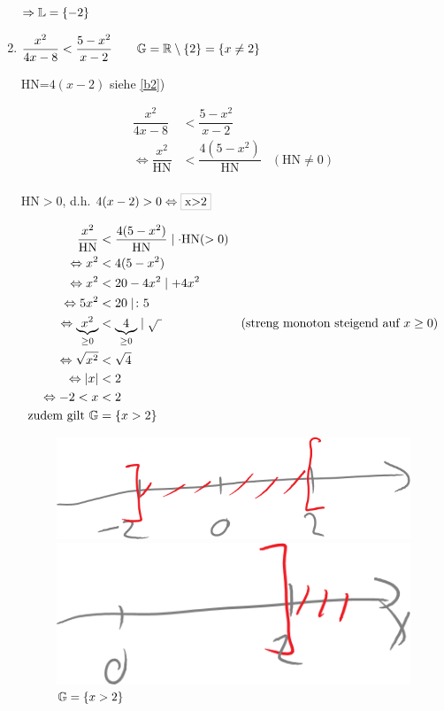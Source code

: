 \begin{enumerate}
	$\Rightarrow \mathbb{L}=\{-2\}$
	
	\clearpage
	\item $\dfrac{x^2}{4x-8} < \dfrac{5-x^2}{x-2}\qquad\mathbb{G}=\mathbb{R}\setminus\{2\}=\{x\ne2\}$
	
	HN=$4(x-2)$ siehe \ref{b2})
	
	\begin{align*}
	\dfrac{x^2}{4x-8} &< \dfrac{5-x^2}{x-2}\\
	\Leftrightarrow\dfrac{x^2}{\text{HN}} &< \dfrac{4(5-x^2)}{\text{HN}}&(\text{HN}\ne0)\\
	\end{align*}
	
	 HN$>0$, d.h. $4(x-2)>0\Leftrightarrow\grayframe{x>2}$
	
	\begin{align*}
	\dfrac{x^2}{\text{HN}} &< \dfrac{4(5-x^2)}{\text{HN}}\mid\cdot\text{HN}(>0)\\
	\Leftrightarrow x^2 &<4(5-x^2)\\
	\Leftrightarrow x^2 &<20-4x^2\mid+4x^2\\
	\Leftrightarrow 5x^2 &<20\mid\colon5\\
	\Leftrightarrow \underbrace{x^2}_{\ge0} &<\underbrace{4}_{\ge0}\mid\sqrt{\ }&\text{(streng monoton steigend auf }x\ge0)\\
	\Leftrightarrow \sqrt{x^2} &< \sqrt{4}\\
	\Leftrightarrow |x| &< 2\\
	\Leftrightarrow -2 < x &< 2\\
	\text{zudem gilt }\mathbb{G} &= \{x>2\}\\
	\end{align*}
	
	\begin{figure}[h!]
		\centering
		\begin{minipage}{0.4\linewidth-1em}
			\includegraphics[width=\linewidth]{Bilder/127}
			\caption{$|x| < 2 \Leftrightarrow -2 < x < 2$}
		\end{minipage}
		\quad
		\begin{minipage}{0.4\linewidth-1em}
			\centering\includegraphics[width=0.8\linewidth]{Bilder/128}
			\caption{$\mathbb{G}=\{x>2\}$}
		\end{minipage}
	\end{figure}
	

\end{enumerate}
